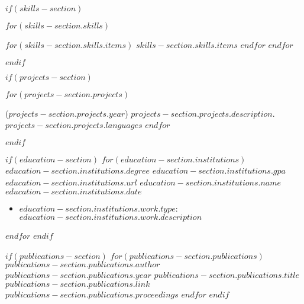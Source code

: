 $if(skills-section)$
\vspace{-13pt}
\begin{description}[align=right,labelwidth=\skillswidth]
\setlength\itemsep{-2pt}
$for(skills-section.skills)$
    \item [$skills-section.skills.heading$:]
    \commasep{\ensuremath{\cdot}}
    $for(skills-section.skills.items)$
        $skills-section.skills.items$
    $endfor$
    \endcommasep
$endfor$
\end{description}
$endif$

$if(projects-section)$
\vspace{-15pt}
\begin{description}[align=left]
\setlength\itemsep{0pt}
$for(projects-section.projects)$
\item
[$projects-section.projects.name$]
($projects-section.projects.year$)
$projects-section.projects.description$.
$projects-section.projects.languages$
$endfor$
\end{description}
\vspace{-10pt}
$endif$

$if(education-section)$
$for(education-section.institutions)$
    \education
    {$education-section.institutions.degree$}
    {$education-section.institutions.gpa$}
    {$education-section.institutions.url$}
    {$education-section.institutions.name$}
    {$education-section.institutions.date$}
    \begin{itemize}[label=\textcolor{gray}{\textbullet}]
    \setlength\itemsep{0pt}
    \item
      $education-section.institutions.work.type$:
      $education-section.institutions.work.description$
    \end{itemize}
$endfor$
$endif$
\vspace{-15pt}

$if(publications-section)$
$for(publications-section.publications)$
\vspace{-15pt}
\publication
{$publications-section.publications.author$}
{$publications-section.publications.year$}
{$publications-section.publications.title$}
{$publications-section.publications.link$}
{$publications-section.publications.proceedings$}
$endfor$
$endif$



